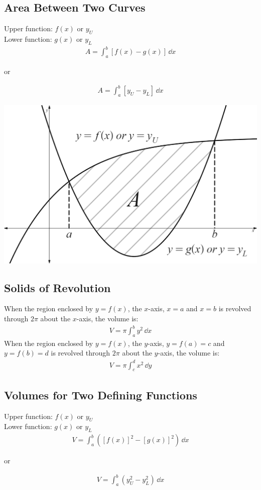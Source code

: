 \documentclass[10pt, a4paper, titlepage]{article}
\begin{document}
\begin{multicols*}{3}
	\subsection{Area Between Two Curves}
	Upper function: $f(x)$ or $y_U$\\
	Lower function: $g(x)$ or $y_L$
	\begin{align}
		A=\int_{a}^{b}\left[f(x)-g(x)\right]\,\dd{x}
	\end{align}
	\begin{center}
		or
	\end{center}
	\begin{align}
		A=\int_{a}^{b}\left[y_U-y_L\right]\,\dd{x}
	\end{align}
	\begin{center}
		\includegraphics[width=0.9\linewidth]{area_between_two_curves.png}\\
	\end{center}

	\dotfill
	\subsection{Solids of Revolution}
	When the region enclosed by $y=f(x)$, the $x$-axis, $x=a$ and $x=b$ is revolved through $2\pi$ about the $x$-axis, the volume is:
	\begin{align}
		V=\pi\int_{a}^{b}y^2\,\dd{x}
	\end{align}
	When the region enclosed by $y=f(x)$, the $y$-axis, $y=f(a)=c$ and $y=f(b)=d$ is revolved through $2\pi$ about the $y$-axis, the volume is:
	\begin{align}
		V=\pi\int_{c}^{d}x^2\,\dd{y}
	\end{align}

	\dotfill
	\subsection{Volumes for Two Defining Functions}
	Upper function: $f(x)$ or $y_U$\\
	Lower function: $g(x)$ or $y_L$
	\begin{align}
		V=\int_{a}^{b}\left(\left[f(x)\right]^2-\left[g(x)\right]^2\right)\,\dd{x}
	\end{align}
	\begin{center}
		or
	\end{center}
	\begin{align}
		V=\int_{a}^{b}\left(y_U^2-y_L^2\right)\,\dd{x}
	\end{align}


\end{multicols*}
\end{document}
